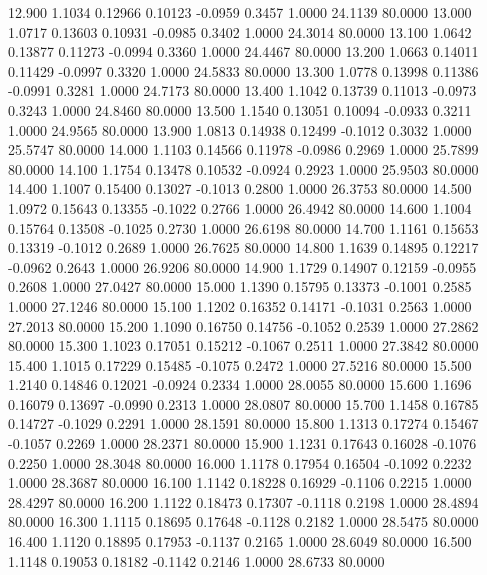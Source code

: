   12.900   1.1034   0.12966   0.10123  -0.0959   0.3457   1.0000  24.1139  80.0000
  13.000   1.0717   0.13603   0.10931  -0.0985   0.3402   1.0000  24.3014  80.0000
  13.100   1.0642   0.13877   0.11273  -0.0994   0.3360   1.0000  24.4467  80.0000
  13.200   1.0663   0.14011   0.11429  -0.0997   0.3320   1.0000  24.5833  80.0000
  13.300   1.0778   0.13998   0.11386  -0.0991   0.3281   1.0000  24.7173  80.0000
  13.400   1.1042   0.13739   0.11013  -0.0973   0.3243   1.0000  24.8460  80.0000
  13.500   1.1540   0.13051   0.10094  -0.0933   0.3211   1.0000  24.9565  80.0000
  13.900   1.0813   0.14938   0.12499  -0.1012   0.3032   1.0000  25.5747  80.0000
  14.000   1.1103   0.14566   0.11978  -0.0986   0.2969   1.0000  25.7899  80.0000
  14.100   1.1754   0.13478   0.10532  -0.0924   0.2923   1.0000  25.9503  80.0000
  14.400   1.1007   0.15400   0.13027  -0.1013   0.2800   1.0000  26.3753  80.0000
  14.500   1.0972   0.15643   0.13355  -0.1022   0.2766   1.0000  26.4942  80.0000
  14.600   1.1004   0.15764   0.13508  -0.1025   0.2730   1.0000  26.6198  80.0000
  14.700   1.1161   0.15653   0.13319  -0.1012   0.2689   1.0000  26.7625  80.0000
  14.800   1.1639   0.14895   0.12217  -0.0962   0.2643   1.0000  26.9206  80.0000
  14.900   1.1729   0.14907   0.12159  -0.0955   0.2608   1.0000  27.0427  80.0000
  15.000   1.1390   0.15795   0.13373  -0.1001   0.2585   1.0000  27.1246  80.0000
  15.100   1.1202   0.16352   0.14171  -0.1031   0.2563   1.0000  27.2013  80.0000
  15.200   1.1090   0.16750   0.14756  -0.1052   0.2539   1.0000  27.2862  80.0000
  15.300   1.1023   0.17051   0.15212  -0.1067   0.2511   1.0000  27.3842  80.0000
  15.400   1.1015   0.17229   0.15485  -0.1075   0.2472   1.0000  27.5216  80.0000
  15.500   1.2140   0.14846   0.12021  -0.0924   0.2334   1.0000  28.0055  80.0000
  15.600   1.1696   0.16079   0.13697  -0.0990   0.2313   1.0000  28.0807  80.0000
  15.700   1.1458   0.16785   0.14727  -0.1029   0.2291   1.0000  28.1591  80.0000
  15.800   1.1313   0.17274   0.15467  -0.1057   0.2269   1.0000  28.2371  80.0000
  15.900   1.1231   0.17643   0.16028  -0.1076   0.2250   1.0000  28.3048  80.0000
  16.000   1.1178   0.17954   0.16504  -0.1092   0.2232   1.0000  28.3687  80.0000
  16.100   1.1142   0.18228   0.16929  -0.1106   0.2215   1.0000  28.4297  80.0000
  16.200   1.1122   0.18473   0.17307  -0.1118   0.2198   1.0000  28.4894  80.0000
  16.300   1.1115   0.18695   0.17648  -0.1128   0.2182   1.0000  28.5475  80.0000
  16.400   1.1120   0.18895   0.17953  -0.1137   0.2165   1.0000  28.6049  80.0000
  16.500   1.1148   0.19053   0.18182  -0.1142   0.2146   1.0000  28.6733  80.0000

